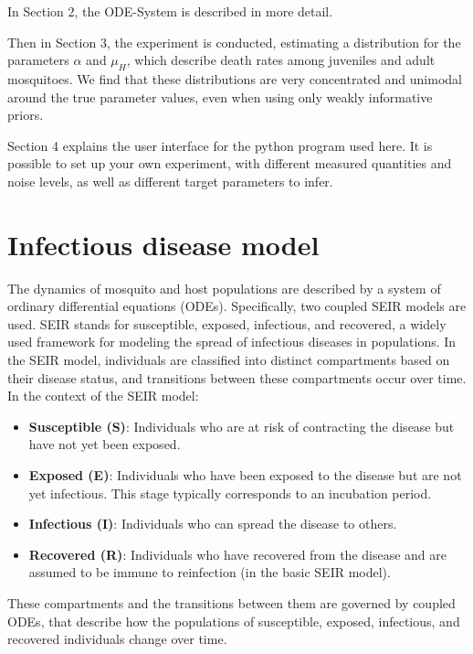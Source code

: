 \documentclass{article}
\begin{document}
In Section 2, the ODE-System is described in more detail. 

Then in Section 3, the experiment is conducted, estimating a distribution for the parameters 
$\alpha$ and $\mu_H$, which describe death rates among juveniles and adult mosquitoes. We 
find that these distributions are very concentrated and unimodal around the true parameter 
values, even when using only weakly informative priors.

Section 4 explains the user interface for the python program used here. It is possible to set 
up your own experiment, with different measured quantities and noise levels, as well as 
different target parameters to infer. 




\section{Infectious disease model}
The dynamics of mosquito and host populations are described by a system of ordinary differential 
equations (ODEs). Specifically, two coupled SEIR models are used. SEIR stands for susceptible, 
exposed, infectious, and recovered, a widely used framework for modeling the spread of infectious 
diseases in populations. In the SEIR model, individuals are classified into distinct compartments 
based on their disease status, and transitions between these compartments occur over time.
In the context of the SEIR model:
\begin{itemize}
    \item \textbf{Susceptible (S)}: Individuals who are at risk of contracting the disease but have not yet been exposed.
    \item \textbf{Exposed (E)}: Individuals who have been exposed to the disease but are not yet infectious. This stage typically corresponds to an incubation period.
    \item \textbf{Infectious (I)}: Individuals who can spread the disease to others.
    \item \textbf{Recovered (R)}: Individuals who have recovered from the disease and are assumed to be immune to reinfection (in the basic SEIR model).
\end{itemize}

These compartments and the transitions between them are governed by coupled ODEs, that describe how the 
populations of susceptible, exposed, infectious, and recovered individuals change over time. 
\end{document}
